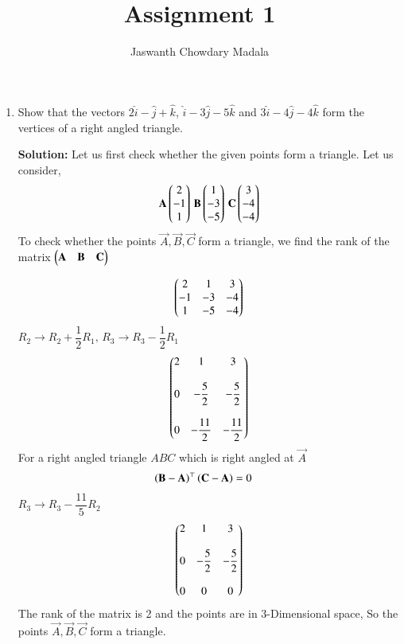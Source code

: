 \documentclass[journal,12pt,twocolumn]{IEEEtran}
\begin{document}
\vspace{3cm}


\title{Assignment 1}
\author{Jaswanth Chowdary Madala}





\maketitle

\newpage


\bigskip

\renewcommand{\thefigure}{\theenumi}
\renewcommand{\thetable}{\theenumi}


\begin{enumerate}

\item Show that the vectors $2\hat{i}-\hat{j}+\hat{k}$, $\hat{i}-3\hat{j}-5\hat{k}$ and $3\hat{i}-4\hat{j}-4\hat{k}$ form the vertices of a right angled triangle.

\textbf{Solution:} Let us first check whether the given points form a triangle. Let us consider, 
\begin{align}
\mathbf{A}\begin{pmatrix}2\\-1\\1\end{pmatrix} \, \mathbf{B}\begin{pmatrix}1\\-3\\-5\end{pmatrix} \, \mathbf{C}\begin{pmatrix}3\\-4\\-4\end{pmatrix} 
\end{align}
To check whether the points $\vec{A},\vec{B},\vec{C}$ form a triangle, we find the rank of the matrix $\begin{pmatrix}\mathbf{A}&\mathbf{B}&\mathbf{C}\end{pmatrix}$

\begin{align}
\begin{pmatrix}2&1&3\\-1&-3&-4\\1&-5&-4\end{pmatrix}
\end{align}
$R_{2} \longrightarrow R_{2}+\dfrac{1}{2}R_{1}, \, R_{3} \longrightarrow R_{3}-\dfrac{1}{2}R_{1}$
\begin{align}
\begin{pmatrix}2&1&3\\ \\0&-\dfrac{5}{2}&-\dfrac{5}{2}\\\\0&-\dfrac{11}{2}&-\dfrac{11}{2}\end{pmatrix}
\end{align}
For a right angled triangle $ABC$ which is right angled at $\vec{A}$  
\begin{align}
\left(\mathbf{B}-\mathbf{A}\right)^{\top}\left(\mathbf{C}-\mathbf{A}\right) &= 0
\end{align}
$R_{3} \longrightarrow R_{3}-\dfrac{11}{5}R_{2}$
\begin{align}
\begin{pmatrix}2&1&3\\ \\0&-\dfrac{5}{2}&-\dfrac{5}{2}\\\\0&0&0\end{pmatrix}
\end{align}
The rank of the matrix is 2 and the points are in 3-Dimensional space, So the points $\vec{A},\vec{B},\vec{C}$ form a triangle.\\


\end{enumerate}
\end{document}
